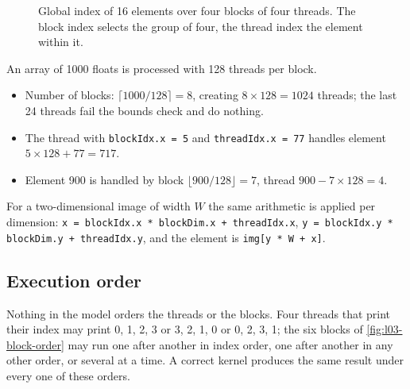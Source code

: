 \documentclass[../main.tex]{subfiles}
\begin{document}
\begin{figure}[tb]
  \centering
  
  \caption{Global index of 16 elements over four blocks of four threads.
    The block index selects the group of four, the thread index the
    element within it.}
  \label{fig:l03-global-index}
\end{figure}

\begin{example}
  \label{ex:l03-index}
  An array of 1000 floats is processed with 128 threads per block.
  \begin{itemize}
    \item Number of blocks: $\lceil 1000/128 \rceil = 8$, creating
      $8 \times 128 = 1024$ threads; the last 24 threads fail the bounds
      check and do nothing.
    \item The thread with \texttt{blockIdx.x = 5} and
      \texttt{threadIdx.x = 77} handles element $5 \times 128 + 77 = 717$.
    \item Element 900 is handled by block $\lfloor 900/128 \rfloor = 7$,
      thread $900 - 7 \times 128 = 4$.
  \end{itemize}
  For a two-dimensional image of width $W$ the same arithmetic is applied
  per dimension: \texttt{x = blockIdx.x * blockDim.x + threadIdx.x},
  \texttt{y = blockIdx.y * blockDim.y + threadIdx.y}, and the element is
  \texttt{img[y * W + x]}.
\end{example}

\subsection{Execution order}

Nothing in the model orders the threads or the blocks.  Four threads that
print their index may print 0, 1, 2, 3 or 3, 2, 1, 0 or 0, 2, 3, 1; the
six blocks of \cref{fig:l03-block-order} may run one after another in
index order, one after another in any other order, or several at a time.
A correct kernel produces the same result under every one of these
orders.
\end{document}
